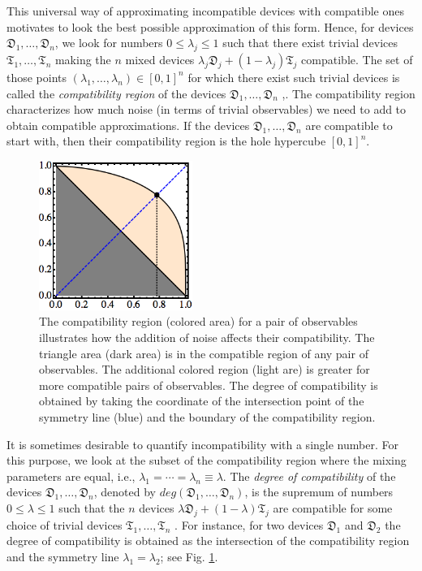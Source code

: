 \documentclass[12pt]{iopart}
\theoremstyle{definition}
\newcommand{\Dev}{\mathfrak{D}} %
\newcommand{\Triv}{\mathfrak{T}} %
\begin{document}
This universal way of approximating incompatible devices with compatible ones motivates to look the best possible approximation of this form. 
Hence, for devices $\Dev_1,\ldots,\Dev_n$, we look for numbers $0\leq \lambda_j \leq 1$ such that there exist trivial devices $\Triv_1,\ldots,\Triv_n$ making the $n$ mixed devices 
$\lambda_j \Dev_j + (1-\lambda_j) \Triv_j$ compatible. 
The set of those points $(\lambda_1,\ldots,\lambda_n)\in [0,1]^n$ for which there exist such trivial devices is called the \emph{compatibility region} of the devices $\Dev_1,\ldots,\Dev_n$ \cite{BuHeScSt13},\cite{Gudder13}.
The compatibility region characterizes how much noise (in terms of trivial observables) we need to add to obtain compatible approximations.
If the devices $\Dev_1,\ldots,\Dev_n$ are compatible to start with, then their compatibility region is the hole hypercube $[0,1]^n$.

\begin{figure}\begin{center}
\includegraphics[width=5cm]{fig_region.png}
\caption{The compatibility region (colored area) for a pair of observables illustrates how the addition of noise affects their compatibility. The triangle area (dark area) is in the compatible region of any pair of observables. 
The additional colored region (light are) is greater for more compatible pairs of observables. 
The degree of compatibility is obtained by taking the coordinate of the intersection point of the symmetry line (blue) and the boundary of the compatibility region.}
\label{fig:degree}
\end{center}
\end{figure}

It is sometimes desirable to quantify incompatibility with a single number.
For this purpose, we look at the subset of the compatibility region where the mixing parameters are equal, i.e.,  $\lambda_1=\cdots =\lambda_n \equiv\lambda$.
The \emph{degree of compatibility} of the devices $\Dev_1,\ldots,\Dev_n$, denoted by $deg(\Dev_1,\ldots,\Dev_n)$, is the supremum of numbers $0\leq \lambda \leq 1$ such that the $n$ devices 
$\lambda \Dev_j + (1-\lambda) \Triv_j$ are compatible for some choice of trivial devices $\Triv_1,\ldots,\Triv_n$ \cite{HeScToZi14}.
For instance, for two devices $\Dev_1$ and $\Dev_2$ the degree of compatibility is obtained as the intersection of the compatibility region and the symmetry line $\lambda_1=\lambda_2$; see Fig. \ref{fig:degree}. 
\end{document}
